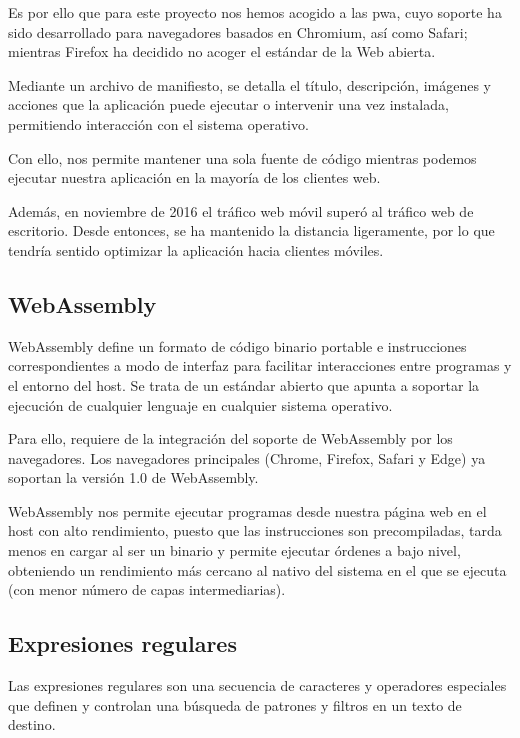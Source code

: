 Es por ello que para este proyecto nos hemos acogido a las \acrshort{pwa}, cuyo soporte ha sido desarrollado para navegadores basados en Chromium, así como Safari; mientras Firefox ha decidido no acoger el estándar de la Web abierta. \cite{firefoxNoPWA}

Mediante un archivo de manifiesto, se detalla el título, descripción, imágenes y acciones que la aplicación puede ejecutar o intervenir una vez instalada, permitiendo interacción con el sistema operativo.

Con ello, nos permite mantener una sola fuente de código mientras podemos ejecutar nuestra aplicación en la mayoría de los clientes web.

Además, en noviembre de 2016 el tráfico web móvil superó al tráfico web de escritorio. Desde entonces, se ha mantenido la distancia ligeramente, por lo que tendría sentido optimizar la aplicación hacia clientes móviles. \cite{movilTraficoMayor}

\subsection{WebAssembly}
\label{tec_hab:wam}

WebAssembly define un formato de código binario portable e instrucciones correspondientes a modo de interfaz para facilitar interacciones entre programas y el entorno del host. Se trata de un estándar abierto que apunta a soportar la ejecución de cualquier lenguaje en cualquier sistema operativo.

Para ello, requiere de la integración del soporte de WebAssembly por los navegadores. Los navegadores principales (Chrome, Firefox, Safari y Edge) ya soportan la versión 1.0 de WebAssembly.

WebAssembly nos permite ejecutar programas desde nuestra página web en el host con alto rendimiento, puesto que las instrucciones son precompiladas, tarda menos en cargar al ser un binario y permite ejecutar órdenes a bajo nivel, obteniendo un rendimiento más cercano al nativo del sistema en el que se ejecuta (con menor número de capas intermediarias).

\subsection{Expresiones regulares}
\label{tec_hab:regex}

Las expresiones regulares son una secuencia de caracteres y operadores especiales que definen y controlan una búsqueda de patrones y filtros en un texto de destino.

